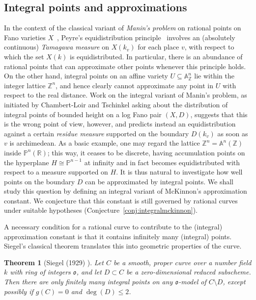 \documentclass[a4paper, twoside, 11pt]{amsart}
\newtheorem{theorem}{Theorem}[section]
\theoremstyle{definition}
\newcommand{\fo}{\mathfrak{o}}
\newcommand{\dA}{\mathbb{A}}
\newcommand{\PP}{\mathbb{P}}
\newcommand{\RR}{\mathbb{R}}
\newcommand{\ZZ}{\mathbb{Z}}
\begin{document}
\subsection{Integral points and approximations} In the context of the classical variant of \emph{Manin's problem} on rational points on Fano varieties $X$~\cite{MR974910}, Peyre's equidistribution principle~\cite{Peyre} involves an (absolutely continuous) \emph{Tamagawa measure} on $X(k_v)$ for each place $v$, with respect to which the set $X(k)$ is equidistributed. In particular, there is an abundance of rational points that can approximate other points whenever this principle holds.
On the other hand, integral points on an affine variety $U\subseteq \dA_\ZZ^n$ lie within the integer lattice $\ZZ^n$, and hence clearly cannot approximate any point in $U$ with respect to the real distance.
Work on the integral variant of Manin's problem, as initiated by Chambert-Loir and Tschinkel \cite{C-L-Tsch} asking about the distribution of integral points of bounded height on a log Fano pair $(X,D)$, suggests that this is the wrong point of view, however, and predicts instead an equidistribution against a certain \emph{residue measure} supported on the boundary $D(k_v)$ as soon as $v$ is archimedean. As a basic example, one may regard the lattice $\ZZ^n=\dA^n(\ZZ)$ inside $\PP^n(\RR)$; this way, it ceases to be discrete, having accumulation points on the hyperplane $H\cong\PP^{n-1}$ at infinity and in fact becomes equidistributed with respect to a measure supported on $H$.
It is thus natural to investigate how well points on the boundary $D$ can be approximated by integral points.
We shall study this question by defining an integral variant of McKinnon's approximation constant. We conjecture that this constant is still governed by rational curves under suitable hypotheses (Conjecture~\ref{conj:integralmckinnon}).

A necessary condition for a rational curve to contribute to the (integral) approximation constant is that it contains infinitely many (integral) points. Siegel's classical theorem translates this into geometric properties of the curve.

\begin{theorem}[Siegel (1929) \cite{Siegel}]\label{thm:Siegel}
	Let $C$ be a smooth, proper curve over a number field $k$ with ring of integers $\fo$, and let $D\subset C$ be a zero-dimensional reduced subscheme. 
	Then there are only finitely many integral points on any $\fo$-model of $C\setminus D$, except possibly if $g(C)=0$ and $\deg(D)\le 2$.
\end{theorem}
\end{document}
